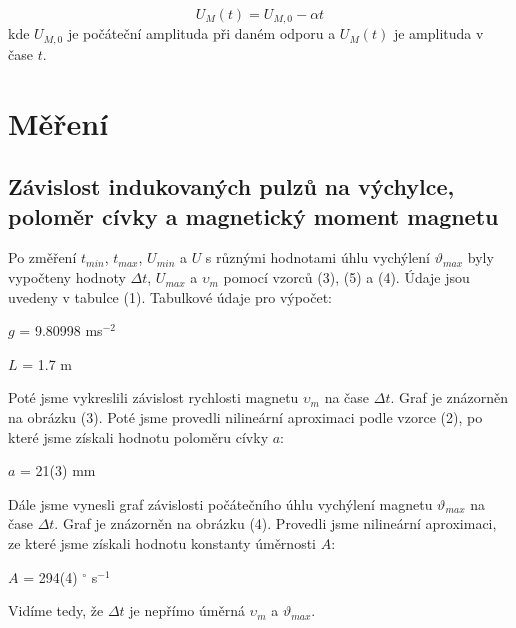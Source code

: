 \documentclass[a4paper,11pt]{article}
\begin{document}
    \begin{minipage}[t]{0.5\textwidth}
                \begin{equation}
                    U_{M}(t) = U_{M, 0} - \alpha t
                \end{equation}
                kde $U_{M, 0}$ je počáteční amplituda při daném odporu a $U_{M}(t)$ je amplituda v čase $t$.
        \section{Měření}  
            \subsection{Závislost indukovaných pulzů na výchylce, poloměr cívky a magnetický moment magnetu}
                Po změření $t_{min}$, $t_{max}$, $U_{min}$ a $U$ s různými hodnotami úhlu vychýlení $\vartheta_{max}$ byly vypočteny hodnoty $\Delta t$, $U_{max}$ a $\upsilon_m$ pomocí vzorců (3), (5) a (4). Údaje jsou uvedeny v tabulce (1). Tabulkové údaje pro výpočet:
                \begin{center}
                    $g$ = 9.80998 ms$^{-2}$ 
                    \vspace{5pt}
                    \par $L$ = 1.7 m
                \end{center}
                Poté jsme vykreslili závislost rychlosti magnetu $\upsilon_m$ na čase $\Delta t$. Graf je znázorněn na obrázku (3). Poté jsme provedli nilineární aproximaci podle vzorce (2), po které jsme získali hodnotu poloměru cívky $a$:
                \begin{center}
                    $a$ = 21(3) mm
                \end{center}
                Dále jsme vynesli graf závislosti počátečního úhlu vychýlení magnetu $\vartheta_{max}$ na čase $\Delta t$. Graf je znázorněn na obrázku (4). Provedli jsme nilineární aproximaci, ze které jsme získali hodnotu konstanty úměrnosti $A$:
                \begin{center}
                    $A$ = 294(4) $^\circ$ s$^{-1}$
                \end{center}
                Vidíme tedy, že $\Delta t$ je nepřímo úměrná $\upsilon_m$ a $\vartheta_{max}$.
    \end{minipage}
\newpage
\end{document}
